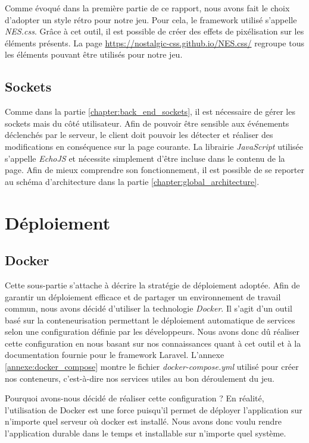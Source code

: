 \documentclass{tnreport}
\begin{document}

Comme évoqué dans la première partie de ce rapport, nous avons fait le choix d'adopter un style rétro pour notre jeu. Pour cela, le framework utilisé s'appelle \textit{NES.css}. Grâce à cet outil, il est possible de créer des effets de pixélisation sur les éléments présents. La page \url{https://nostalgic-css.github.io/NES.css/} regroupe tous les éléments pouvant être utilisés pour notre jeu. 

\subsection{Sockets}

Comme dans la partie \ref{chapter:back_end_sockets}, il est nécessaire de gérer les sockets mais du côté utilisateur. Afin de pouvoir être sensible aux événements déclenchés par le serveur, le client doit pouvoir les détecter et réaliser des modifications en conséquence sur la page courante. La librairie \textit{JavaScript} utilisée s'appelle \textit{EchoJS} et nécessite simplement d'être incluse dans le contenu de la page. Afin de mieux comprendre son fonctionnement, il est possible de se reporter au schéma d'architecture dans la partie \ref{chapter:global_architecture}.

\section{Déploiement}

\subsection{Docker}

Cette sous-partie s'attache à décrire la stratégie de déploiement adoptée. Afin de garantir un déploiement efficace et de partager un environnement de travail commun, nous avons décidé d'utiliser la technologie \textit{Docker}. Il s'agit d'un outil basé sur la conteneurisation permettant le déploiement automatique de services selon une configuration définie par les développeurs. Nous avons donc dû réaliser cette configuration en nous basant sur nos connaissances quant à cet outil et à la documentation fournie pour le framework Laravel. L'annexe \ref{annexe:docker_compose} montre le fichier \textit{docker-compose.yml} utilisé pour créer nos conteneurs, c'est-à-dire nos services utiles au bon déroulement du jeu.

Pourquoi avons-nous décidé de réaliser cette configuration ? En réalité, l'utilisation de Docker est une force puisqu'il permet de déployer l'application sur n'importe quel serveur où docker est installé. Nous avons donc voulu rendre l'application durable dans le temps et installable sur n'importe quel système.
\end{document}
